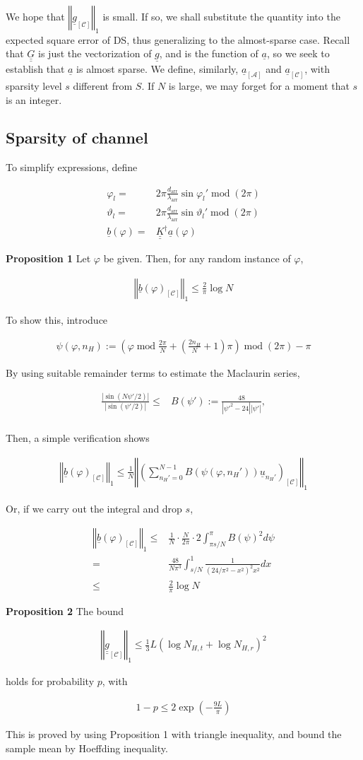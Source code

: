 \documentclass[journal]{IEEEtran}
\newcommand {\f} {\varphi}
\renewcommand {\l} {\lambda}
\renewcommand {\th} {\vartheta}
\newcommand {\D} {\cdot}
\newcommand {\Adj} {\dagger}
\newcommand {\m} [1] {\( #1 \)}
\newcommand {\V} [1] {\underline {#1}}
\newcommand {\M} [1] {\underline {\underline {#1}}}
\newcommand {\RB} [1] {\left( #1 \right)}
\newcommand {\SB} [1] {\left[ #1 \right]}
\newcommand {\Nm} [1] {\left \vert #1 \right \vert}
\newcommand {\VNm} [1] {\left \Vert #1 \right \Vert}
\newcommand {\Disp} [1] {
   \begin {align*}
      #1
   \end {align*}
}
\begin{document}
We hope that \m {\VNm {\V {g} _{\SB{\mathcal {C}}}} _1} is small.
If so, we shall substitute the quantity into the expected square error of DS, thus generalizing to the almost-sparse case.
Recall that \m {\M {G}} is just the vectorization of \m {\V {g}}, and is the function of \m {\V {a}}, so we seek to establish that \m {\V {a}} is almost sparse.
We define, similarly, \m {\V {a} _{\SB{\mathcal {A}}}} and \m {\V {a} _{\SB{\mathcal {C}}}}, with sparsity level \m {s} different from \m {S}.
If \m {N} is large, we may forget for a moment that \m {s} is an integer.

\subsection {Sparsity of channel}

To simplify expressions, define
\Disp {
\f_l
= &2\pi \frac {d_{\mathrm {arr}}} {\l_{\mathrm {arr}}} \sin \f_l'
  \; \mathrm {mod}\; \RB {2\pi} \\
\th_l
= &2\pi \frac {d_{\mathrm {arr}}} {\l_{\mathrm {arr}}} \sin \th_l'
  \; \mathrm {mod}\; \RB {2\pi}  \\
\V {b} \RB {\f}
= &\M {K}^\Adj \V {a} \RB {\f}
}

\textbf {Proposition 1}
Let \m {\f} be given.
Then, for any random instance of \m {\f},
\Disp {
\VNm {\V {b} \RB {\f} _{\SB{\mathcal {C}}}} _1
\leq \frac {2} {\pi} \log N 
}

To show this, introduce
\Disp {
\psi \RB {\f, n_H}
:=\RB {
   \f \; \mathrm {mod}\; \frac {2\pi} {N}
   + \RB {\frac {2 n_H} {N} + 1} \pi
} \;
\mathrm {mod}\; \RB {2\pi}
- \pi 
}
By using suitable remainder terms to estimate the Maclaurin series,
\Disp {
\frac {\Nm {\sin \RB {N \psi'/2}}} {\Nm {\sin \RB {\psi' /2}}}
\leq &B \RB {\psi'}
:= \frac {48} {\Nm {\psi'^2 -24} \Nm {\psi'}}, \\
}
Then, a simple verification shows
\Disp {
\VNm {\V {b} \RB {\f} _{\SB{\mathcal {C}}}} _1
\leq \frac {1} {N}
\VNm {
\RB {
   \sum_{n_H' =0}^{N -1}
      B \RB {\psi \RB {\f, n_H'}}
      \V {u} _{n_H'}
} _{\SB{\mathcal {C}}}
} _1
}
Or, if we carry out the integral and drop \m {s},
\Disp {
\VNm {\V {b} \RB {\f} _{\SB{\mathcal {C}}}} _1
\leq &\frac {1} {N} \D \frac {N} {2\pi} \D 2 \int_{\pi s/N}^{\pi} B \RB {\psi} ^2 d \psi \\
= &\frac {48} {N \pi^3}
\int _{s /N} ^1 \frac {1} {\RB {24/\pi^2 -x^2} ^2 x^2} dx \\
\leq &\frac {2} {\pi} \log N 
}

\textbf {Proposition 2}
The bound
\Disp {
\VNm {\M {g} _{\SB{\mathcal {C}}}} _1
\leq \frac {1} {3} L \RB {\log N_{H,t} + \log N_{H,r}} ^2
}
holds for probability \m {p}, with
\Disp {
1 -p
\leq 2 \exp \RB {- \frac {9L} {\pi}} 
}
This is proved by using Proposition 1 with triangle inequality, and bound the sample mean by Hoeffding inequality.
\end{document}
